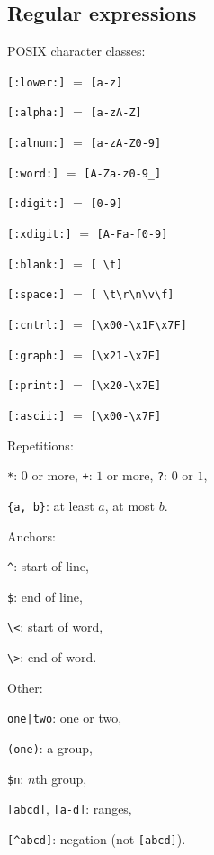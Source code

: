\subsection{Regular expressions}
\begin{compactenum}
\item POSIX character classes:
\begin{compactenum}
\item \texttt{[:lower:]} $=$ \texttt{[a-z]}
\item \texttt{[:alpha:]} $=$ \texttt{[a-zA-Z]}
\item \texttt{[:alnum:]} $=$ \texttt{[a-zA-Z0-9]}
\item \texttt{[:word:]} $=$ \texttt{[A-Za-z0-9\_]}
\item \texttt{[:digit:]} $=$ \texttt{[0-9]}
\item \texttt{[:xdigit:]} $=$ \texttt{[A-Fa-f0-9]}
\item \texttt{[:blank:]} $=$ \texttt{[ \textbackslash{}t]}
\item \texttt{[:space:]} $=$ \texttt{[ \textbackslash{}t\textbackslash{}r\textbackslash{}n\textbackslash{}v\textbackslash{}f]}
\item \texttt{[:cntrl:]} $=$ \texttt{[\textbackslash{}x00-\textbackslash{}x1F\textbackslash{}x7F]}
\item \texttt{[:graph:]} $=$ \texttt{[\textbackslash{}x21-\textbackslash{}x7E]}
\item \texttt{[:print:]} $=$ \texttt{[\textbackslash{}x20-\textbackslash{}x7E]}
\item \texttt{[:ascii:]} $=$ \texttt{[\textbackslash{}x00-\textbackslash{}x7F]}
\end{compactenum}
\item Repetitions:
\begin{compactenum}
\item \texttt{*}: $0$ or more, \texttt{+}: $1$ or more, \texttt{?}: $0$ or $1$,
\item \texttt{\{a, b\}}: at least $a$, at most $b$.
\end{compactenum}
\item Anchors:
\begin{compactenum}
\item \texttt{\textasciicircum}: start of line,
\item \texttt{\$}: end of line, 
\item \texttt{\textbackslash{}<}: start of word, 
\item \texttt{\textbackslash{}>}: end of word.
\end{compactenum}
\item Other:
\begin{compactenum}
\item \texttt{one|two}: one or two,
\item \texttt{(one)}: a group,
\item \texttt{\$n}: $n$th group,
\item \texttt{[abcd]}, \texttt{[a-d]}: ranges,
\item \texttt{[\textasciicircum{}abcd]}: negation (not \texttt{[abcd]}).
\end{compactenum}
\end{compactenum}
